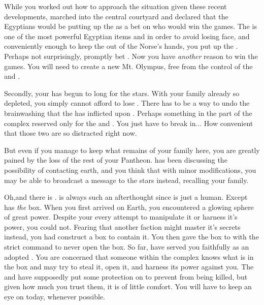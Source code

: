 \documentclass[char]{guardians}
\begin{document}
While you worked out how to approach the situation given these recent developments, \cOsiris{} marched into the central courtyard and declared that the Egyptians would be putting up the \iNecro{\MYname} as a bet on who would win the games. The \iNecro{\MYname} is one of the most powerful Egyptian items and in order to avoid losing face, and conveniently enough to keep the \iSandals{\MYname} out of the Norse's hands, you put up the \iSandals{\MYname}. Perhaps not surprisingly, \cOdin{} promptly bet \iHammer{\MYname}. Now you have \emph{another} reason to win the games. You will need \iHammer{\MYname} to create a new Mt. Olympus, free from the control of the \cCaretaker{} and \cWarden{}.

Secondly, your \cAthena{\offspring} \cAthena{} has begun to long for the stars. With your family already so depleted, you simply cannot afford to lose \cAthena{\them}. There has to be a way to undo the brainwashing that the \cCaretaker{} has inflicted upon \cAthena{}. Perhaps something in the part of the complex reserved only for the \cCaretaker{} and \cWarden{}. You just have to break in... How convenient that those two are so distracted right now.

But even if you manage to keep what remains of your family here, you are greatly pained by the loss of the rest of your Pantheon.  \cHephaestus{} has been discussing the possibility of contacting earth, and you think that with minor modifications, you may be able to broadcast a message to the stars instead, recalling your family.

Oh,and there is \cPandora{}. \cPandora{\They} is always such an afterthought since \cPandora{\they} is just a human. Except \cPandora{} has \emph{the} box. When you first arrived on Earth, you encountered a glowing sphere of great power. Despite your every attempt to manipulate it or harness it's power, you could not. Fearing that another faction might master it's secrets instead, you had \cHephaestus{} construct a box to contain it. You then gave the box to \cPandora{} with the strict command to never open the box. So far, \cPandora{\they} have served you faithfully as an adopted \cPandora{\offspring}. You are concerned that someone within the complex knows what is in the box and may try to steal it, open it, and harness its power against you. The \cCaretaker{} and \cWarden{} have supposedly put some protection on \cPandora{} to prevent \cPandora{\them} from being killed, but given how much you trust them, it is of little comfort. You will have to keep an eye on \cPandora{} today, whenever possible.
\end{document}
